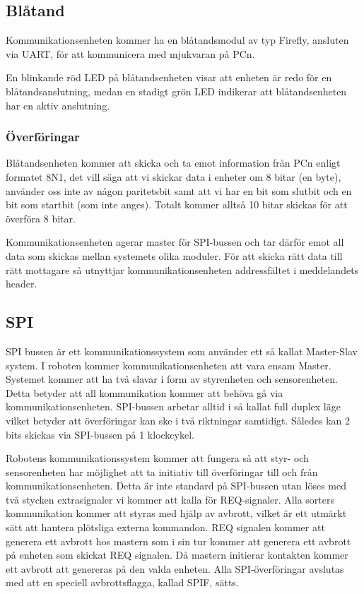 \subsection{Blåtand}
Kommunikationsenheten kommer ha en blåtandsmodul av typ Firefly, ansluten via
UART, för att kommunicera med mjukvaran på PCn.

En blinkande röd LED på blåtandsenheten visar att enheten är redo för en
blåtandsanslutning, medan en stadigt grön LED indikerar att blåtandsenheten har
en aktiv anslutning.

\subsubsection{Överföringar}
Blåtandsenheten kommer att skicka och ta emot information från PCn enligt formatet
8N1, det vill säga att vi skickar data i enheter om 8 bitar (en byte), använder oss
inte av någon paritetsbit samt att vi har en bit som slutbit och en bit som startbit
(som inte anges). Totalt kommer alltså 10 bitar skickas för att överföra 8
bitar. 

Kommunikationsenheten agerar master för SPI-bussen och tar därför emot all data
som skickas mellan systemets olika moduler. För att skicka rätt data till rätt
mottagare så utnyttjar kommunikationsenheten addressfältet i meddelandets
header.

\subsection{SPI}
\label{sec:SPI}
SPI bussen är ett kommunikationssystem som använder ett så kallat Master-Slav system. I roboten kommer kommunikationsenheten att vara ensam Master. Systemet kommer att ha två slavar i form av styrenheten och sensorenheten.
Detta betyder att all kommunikation kommer att behöva gå via kommunikationsenheten. SPI-bussen arbetar alltid i så kallat full duplex läge vilket betyder att överföringar kan ske i två riktningar samtidigt. Således kan 2 bits skickas via SPI-bussen på 1 klockcykel. 

Robotens kommunikationssystem kommer att fungera så att styr- och sensorenheten har möjlighet att ta initiativ till överföringar till och från kommunikationsenheten. Detta är inte standard på SPI-bussen utan löses med två stycken extrasignaler vi kommer att kalla för REQ-signaler. Alla sorters kommunikation kommer att styras med hjälp av avbrott, vilket är ett utmärkt sätt att hantera plötsliga externa kommandon. REQ signalen kommer att generera ett avbrott hos mastern som i sin tur kommer att generera ett avbrott på enheten som skickat REQ signalen. Då mastern initierar kontakten kommer ett avbrott att genereras på den valda enheten. Alla SPI-överföringar avslutas med att en speciell avbrottsflagga, kallad SPIF, sätts.

